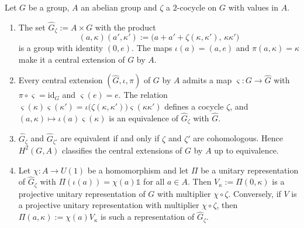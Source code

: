 \begin{proposition}\label{prop:cocycle-extension}
	Let $G$ be a group, $A$ an abelian group and $\zeta$ a $2$-cocycle on $G$ with values in $A$.
	\begin{enumerate}
		\item The set $\widehat{G}_\zeta:=A\times G$ with the product
		\begin{equation*}
			(a,\kappa)(a',\kappa'):=\big(a+a'+\zeta(\kappa,\kappa'),\,\kappa\kappa'\big)
		\end{equation*}
		is a group with identity $(0,e)$. The maps $\iota(a)=(a,e)$ and $\pi(a,\kappa)=\kappa$ make it a central extension of $G$ by $A$.
		\item Every central extension $(\widehat{G},\iota,\pi)$ of $G$ by $A$ admits a map $\varsigma:G\to\widehat{G}$ with $\pi\circ\varsigma=\mathrm{id}_G$ and $\varsigma(e)=e$. The relation $\varsigma(\kappa)\varsigma(\kappa')=\iota\big(\zeta(\kappa,\kappa')\big)\varsigma(\kappa\kappa')$ defines a cocycle $\zeta$, and $(a,\kappa)\mapsto\iota(a)\varsigma(\kappa)$ is an equivalence of $\widehat{G}_\zeta$ with $\widehat{G}$.
		\item $\widehat{G}_\zeta$ and $\widehat{G}_{\zeta'}$ are equivalent if and only if $\zeta$ and $\zeta'$ are cohomologous. Hence $H^2(G,A)$ classifies the central extensions of $G$ by $A$ up to equivalence.
		\item Let $\chi:A\to U(1)$ be a homomorphism and let $\Pi$ be a unitary representation of $\widehat{G}_\zeta$ with $\Pi(\iota(a))=\chi(a)\mathbb{1}$ for all $a\in A$. Then $V_\kappa:=\Pi(0,\kappa)$ is a projective unitary representation of $G$ with multiplier $\chi\circ\zeta$. Conversely, if $V$ is a projective unitary representation with multiplier $\chi\circ\zeta$, then $\Pi(a,\kappa):=\chi(a)V_\kappa$ is such a representation of $\widehat{G}_\zeta$.
	\end{enumerate}
\end{proposition}

